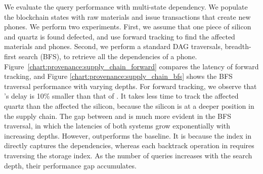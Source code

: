 We evaluate the query performance with multi-state dependency. We populate the blockchain states with
raw materials and issue transactions that create new phones.  We perform two experiments. First, we assume
that one piece of silicon and quartz is found defected, and use forward tracking to find the
affected materials and phones. Second, we perform a standard DAG traversals, breadth-first search (BFS), to retrieve all the dependencies of a phone. 
Figure~\ref{chart:provenance:supply_chain_forward} compares the latency of forward tracking, and Figure
\ref{chart:provenance:supply_chain_bfs} shows the BFS traversal performance with varying depths.  For forward tracking, we observe that
{\fsO}'s delay is 10\% smaller than that of {\fsPrO}.  It takes less time to track the affected quartz than
the affected the silicon, because the silicon is at a deeper position in the supply
chain.  The gap between {\fsO} and {\fsPrO} is much more evident in the BFS traversal, 
in which the latencies of both systems grow exponentially with increasing depths.  However,
{\fsO} outperforms the baseline.  It is because the index in {\fsO} directly captures the dependencies,
whereas each backtrack operation in {\fsPrO} requires traversing the storage index.  As the number of queries
increases with the search depth, their performance gap accumulates.  

